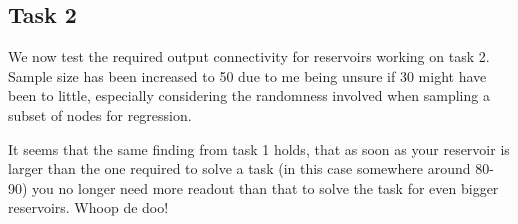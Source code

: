 \begin{figure*}[ht]
    \resizebox{\textwidth}{!}{
        \subfloat[N=80]{
            
        }
        \subfloat[N=90]{
            
        }
    }
    \resizebox{\textwidth}{!}{
        \subfloat[N=100]{
            
        }
    }
\end{figure*}

\subsection{Task 2}

We now test the required output connectivity for reservoirs working on task 2.
Sample size has been increased to 50 due to me being unsure if 30 might have been to little,
especially considering the randomness involved when sampling a subset of nodes for regression.

It seems that the same finding from task 1 holds, that as soon as your reservoir is larger than the one required to solve a task (in this case somewhere around 80-90) you no longer need more readout than that to solve the task for even bigger reservoirs.
Whoop de doo!

\begin{figure*}[ht]
    \centering
    \resizebox{\textwidth}{!}{
        \subfloat[N=10]{
            
        }
        \subfloat[N=20]{
            
        }
    }
    \resizebox{\textwidth}{!}{
        \subfloat[N=30]{
            
        }
        \subfloat[N=40]{
            
        }
    }
    \resizebox{\textwidth}{!}{
        \subfloat[N=50]{
            
        }
        \subfloat[N=60]{
            
        }
    }
\end{figure*}

